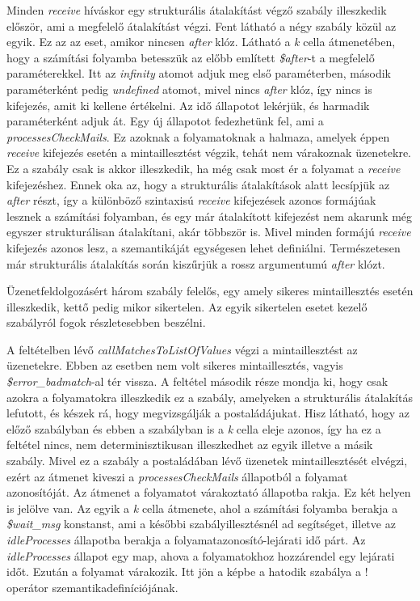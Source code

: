 Minden \textit{receive} híváskor egy strukturális átalakítást végző szabály illeszkedik először, ami a megfelelő átalakítást végzi. Fent látható a négy szabály közül az egyik. Ez az az eset, amikor nincsen \textit{after} klóz. Látható a \textit{k} cella átmenetében, hogy a számítási folyamba betesszük az előbb említett \textit{\$after}-t a megfelelő paraméterekkel. Itt az \textit{infinity} atomot adjuk meg első paraméterben, második paraméterként pedig \textit{undefined} atomot, mivel nincs \textit{after} klóz, így nincs is kifejezés, amit ki kellene értékelni. Az idő állapotot lekérjük, és harmadik paraméterként adjuk át. Egy új állapotot fedezhetünk fel, ami a \textit{processesCheckMails}. Ez azoknak a folyamatoknak a halmaza, amelyek éppen \textit{receive} kifejezés esetén a mintaillesztést végzik, tehát nem várakoznak üzenetekre. Ez a szabály csak is akkor illeszkedik, ha még csak most ér a folyamat a \textit{receive} kifejezéshez. Ennek oka az, hogy a strukturális átalakítások alatt lecsípjük az \textit{after} részt, így a különböző szintaxisú \textit{receive} kifejezések azonos formájúak lesznek a számítási folyamban, és egy már átalakított kifejezést nem akarunk még egyszer strukturálisan átalakítani, akár többször is. Mivel minden formájú \textit{receive} kifejezés azonos lesz, a szemantikáját egységesen lehet definiálni. Természetesen már strukturális átalakítás során kiszűrjük a rossz argumentumú \textit{after} klózt.

Üzenetfeldolgozásért három szabály felelős, egy amely sikeres mintaillesztés esetén illeszkedik, kettő pedig mikor sikertelen. Az egyik sikertelen esetet kezelő szabályról fogok részletesebben beszélni.

\newpage



A feltételben lévő \textit{callMatchesToListOfValues} végzi a mintaillesztést az üzenetekre. Ebben az esetben nem volt sikeres mintaillesztés, vagyis \textit{\$error\_badmatch}-al tér vissza. A feltétel második része mondja ki, hogy csak azokra a folyamatokra illeszkedik ez a szabály, amelyeken a strukturális átalakítás lefutott, és készek rá, hogy megvizsgálják a postaládájukat. Hisz látható, hogy az előző szabályban és ebben a szabályban is a \textit{k} cella eleje azonos, így ha ez a feltétel nincs, nem determinisztikusan illeszkedhet az egyik illetve a másik szabály. Mivel ez a szabály a postaládában lévő üzenetek mintaillesztését elvégzi, ezért az átmenet kiveszi a \textit{processesCheckMails} állapotból a folyamat azonosítóját. Az átmenet a folyamatot várakoztató állapotba rakja. Ez két helyen is jelölve van. Az egyik a \textit{k} cella átmenete, ahol a számítási folyamba berakja a \textit{\$wait\_msg} konstanst, ami a későbbi szabályillesztésnél ad segítséget, illetve az \textit{idleProcesses} állapotba berakja a folyamatazonosító-lejárati idő párt. Az \textit{idleProcesses} állapot egy map, ahova a folyamatokhoz hozzárendel egy lejárati időt. Ezután a folyamat várakozik. Itt jön a képbe a hatodik szabálya a ! operátor szemantikadefiníciójának.

